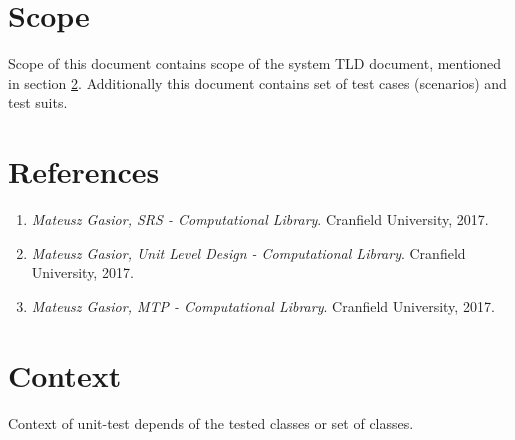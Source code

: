 \section{Scope} \label{s:introduction:scope}
	\begin{comment}
		Identify the test items (software or system) that are the object of testing, e.g., specific attributes of the
		software, the installation instructions, the user instructions, interfacing hardware, database conversion
		software that is not a part of the operational system) including their version/revision level. Also
		identify any procedures for their transfer from other environments to the test environment.
		Supply references to the test item documentation relevant to an individual level of test, if it exists, such
		as follows:
		⎯ Requirements
		⎯ Design
		⎯ User’s guide
		⎯ Operations guide
		⎯ Installation guide
		Reference any Anomaly Reports relating to the test items.
		Identify any items that are to be specifically excluded from testing.
	\end{comment}
	Scope of this document contains scope of the system \gls{TLD} document, mentioned in section \ref{s:introduction:references}. Additionally this document contains set of test cases (scenarios) and test suits.
	
\section{References} \label{s:introduction:references}
	\begin{comment}
		List all of the applicable reference documents. The references are separated into “external” references
		that are imposed external to the project and “internal” references that are imposed from within to the
		project. This may also be at the end of the document.
	\end{comment}
	\begin{enumerate}
		\item \emph{Mateusz Gasior, \gls{SRS} - Computational Library}. Cranfield University, 2017.
		\item \emph{Mateusz Gasior, Unit Level Design - Computational Library}. Cranfield University, 2017.
		\item \emph{Mateusz Gasior, \gls{MTP} - Computational Library}. Cranfield University, 2017.
	\end{enumerate}
\section{Context} \label{s:introduction:context}
	\begin{comment}
		Provide any required context that is not already covered by other sections of this document (e.g., thirdparty
		testing via the Internet).
	\end{comment}
	Context of unit-test depends of the tested classes or set of classes.
